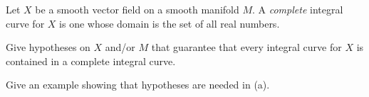 Let $X$ be a smooth vector field on a smooth manifold $M$. A
\emph{complete} integral curve for $X$ is one whose domain is the set of
all real numbers.
\begin{alist}
\item Give hypotheses on $X$ and/or $M$ that guarantee that every integral
curve for $X$ is contained in a complete integral curve.
\item Give an example showing that hypotheses are needed in (a).
\end{alist}
